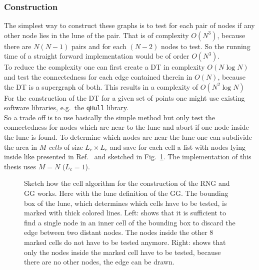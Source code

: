     \subsubsection{Construction}
        The simplest way to construct these graphs is to test for each
        pair of nodes if any other node lies in
        the lune of the pair. That is of complexity \(O (N^3)\), because
        there are \(N(N-1)\) pairs and for each \((N-2)\) nodes to test. So
        the running time of a straight forward implementation would be of
        order \(O(N^3)\).\\
        To reduce the complexity one can first create a DT in complexity \(O (N \log N)\)
        \cite{RNGCell} and test the connectedness for each edge contained
        therein in \(O (N)\), because the DT is a supergraph of both.
        This results in a complexity of \(O (N^2 \log N)\)
        For the construction of the DT for a given set of points one might
        use existing software libraries, e.g.\ the \texttt{qHull}\cite{qhull} library.\\
        So a trade off is to use basically the simple method but only test
        the connectedness for nodes which are near to the lune and abort if
        one node inside the lune is found. To determine which nodes are
        near the lune one can subdivide the area in \(M\) \emph{cells} of size
        \(L_c \times L_c\) and save for each cell a list with nodes lying
        inside like presented in Ref.\ \cite{RNGCell} and sketched in Fig.\ \ref{fig:cell}.
        The implementation of this thesis uses \(M = N\) (\(L_c = 1\)).
        \begin{figure}[htbp]
            \centering
            \caption[Sketch how the Cell Method works]
            {
                Sketch how the cell algorithm for the construction of the
                RNG and GG works. Here with the lune definition of the GG.
                The bounding box of the lune, which determines which cells have
                to be tested, is marked with thick colored lines.
                Left: shows that it is sufficient to find a
                single node in an inner cell of the bounding box to discard
                the edge between two distant nodes. The nodes inside the
                other 8 marked cells do not have to be tested anymore.
                Right: shows that only the nodes inside the
                marked cell have to be tested, because there are no other nodes,
                the edge can be drawn.
            }
            \label{fig:cell}
        \end{figure}\\
